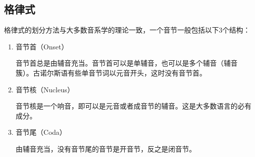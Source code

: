 \subsection*{格律式}

格律式的划分方法与大多数音系学的理论一致，一个音节一般包括以下3个结构：
\begin{enumerate}[itemindent=1em]
    \item 音节首（Onset）

          音节首总是由辅音充当。音节首可以是单辅音，也可以是多个辅音（辅音簇）。古诺尔斯语有些单音节词以元音开头，这时没有音节首。
    \item 音节核（Nucleus）

          音节核是一个响音，即可以是元音或者成音节的辅音。这是大多数语言的必有成分。
    \item 音节尾（Coda）

          由辅音充当，没有音节尾的音节是开音节，反之是闭音节。

\end{enumerate}

